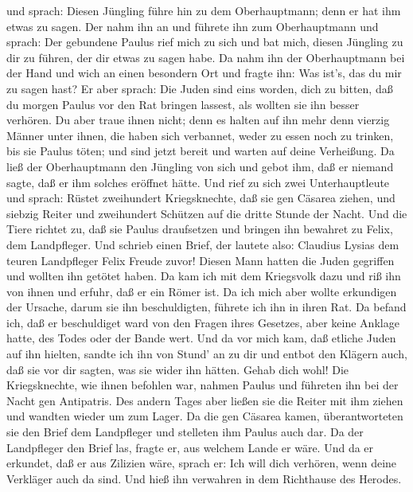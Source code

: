 und sprach: Diesen Jüngling führe hin zu dem Oberhauptmann; denn er hat
ihm etwas zu sagen.  Der nahm ihn an und führete ihn zum
Oberhauptmann und sprach: Der gebundene Paulus rief mich zu sich und bat
mich, diesen Jüngling zu dir zu führen, der dir etwas zu sagen habe.
 Da nahm ihn der Oberhauptmann bei der Hand und wich an
einen besondern Ort und fragte ihn: Was ist's, das du mir zu sagen hast?
 Er aber sprach: Die Juden sind eins worden, dich zu
bitten, daß du morgen Paulus vor den Rat bringen lassest, als wollten
sie ihn besser verhören.  Du aber traue ihnen nicht; denn
es halten auf ihn mehr denn vierzig Männer unter ihnen, die haben sich
verbannet, weder zu essen noch zu trinken, bis sie Paulus töten; und
sind jetzt bereit und warten auf deine Verheißung.  Da ließ
der Oberhauptmann den Jüngling von sich und gebot ihm, daß er niemand
sagte, daß er ihm solches eröffnet hätte.  Und rief zu sich
zwei Unterhauptleute und sprach: Rüstet zweihundert Kriegsknechte, daß
sie gen Cäsarea ziehen, und siebzig Reiter und zweihundert Schützen auf
die dritte Stunde der Nacht.  Und die Tiere richtet zu, daß
sie Paulus draufsetzen und bringen ihn bewahret zu Felix, dem
Landpfleger.  Und schrieb einen Brief, der lautete also:
 Claudius Lysias dem teuren Landpfleger Felix Freude zuvor!
 Diesen Mann hatten die Juden gegriffen und wollten ihn
getötet haben. Da kam ich mit dem Kriegsvolk dazu und riß ihn von ihnen
und erfuhr, daß er ein Römer ist.  Da ich mich aber wollte
erkundigen der Ursache, darum sie ihn beschuldigten, führete ich ihn in
ihren Rat.  Da befand ich, daß er beschuldiget ward von den
Fragen ihres Gesetzes, aber keine Anklage hatte, des Todes oder der
Bande wert.  Und da vor mich kam, daß etliche Juden auf ihn
hielten, sandte ich ihn von Stund' an zu dir und entbot den Klägern
auch, daß sie vor dir sagten, was sie wider ihn hätten. Gehab dich wohl!
 Die Kriegsknechte, wie ihnen befohlen war, nahmen Paulus
und führeten ihn bei der Nacht gen Antipatris.  Des andern
Tages aber ließen sie die Reiter mit ihm ziehen und wandten wieder um
zum Lager.  Da die gen Cäsarea kamen, überantworteten sie
den Brief dem Landpfleger und stelleten ihm Paulus auch dar.
 Da der Landpfleger den Brief las, fragte er, aus welchem
Lande er wäre. Und da er erkundet, daß er aus Zilizien wäre, sprach er:
 Ich will dich verhören, wenn deine Verkläger auch da sind.
Und hieß ihn verwahren in dem Richthause des Herodes.

